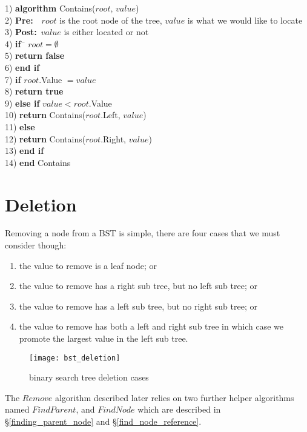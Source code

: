 \newpage
\begin{tabbing}
1)  \textbf{alg}\= \textbf{orithm} Contains($root$, $value$) \\
2)  \> \textbf{Pre:}~~$root$ is the root node of the tree, $value$ is what we would like to locate \\
3)  \> \textbf{Post:}~$value$ is either located or not \\
4)  \> \textbf{if}~\= $root = \emptyset$ \\
5)  \> \> \textbf{return false} \\
6)  \> \textbf{end if} \\
7)  \> \textbf{if} $root$.Value $= value$ \\
8)  \> \> \textbf{return true} \\
9)  \> \textbf{else if} $value < root$.Value \\
10) \> \> \textbf{return} Contains($root$.Left, $value$) \\
11) \> \textbf{else} \\
12) \> \> \textbf{return} Contains($root$.Right, $value$) \\
13) \> \textbf{end if} \\
14) \textbf{end} Contains \\
\end{tabbing}

\section{Deletion}
Removing a node from a BST is simple, there are four cases that we must consider though: 
\begin{enumerate}
\item the value to remove is a leaf node; or
\item the value to remove has a right sub tree, but no left sub tree; or
\item the value to remove has a left sub tree, but no right sub tree; or
\item the value to remove has both a left and right sub tree in which case we promote the largest value in the left sub tree.
\end{enumerate}
\begin{figure}[htp]
\begin{center}
\texttt{[image: bst\_deletion]}
\end{center}
\caption{binary search tree deletion cases} \label{fig:bst_deletion}
\end{figure}

The $Remove$ algorithm described later relies on two further helper algorithms named $FindParent$, and $FindNode$ which are described in \S\ref{finding_parent_node} and \S\ref{find_node_reference}.

